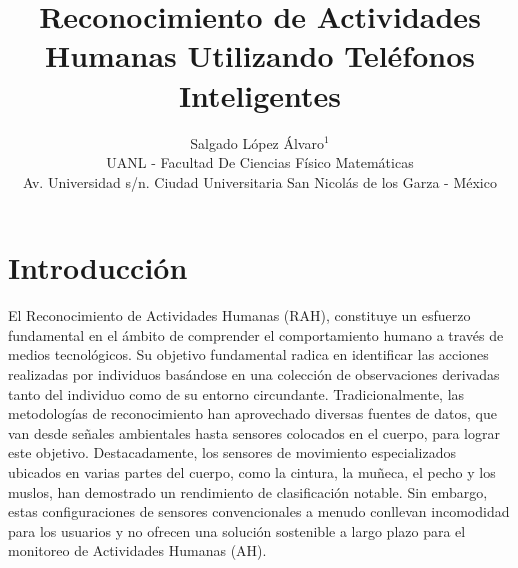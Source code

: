 \documentclass{esannV2}
\begin{document}
\title{Reconocimiento de Actividades Humanas Utilizando Teléfonos Inteligentes}

\author{Salgado López Álvaro$^1$
%
%
\vspace{.3cm}\\
%
UANL - Facultad De Ciencias Físico Matemáticas \\
Av. Universidad s/n. Ciudad Universitaria San Nicolás de los Garza - México
}
%
\maketitle


\section{Introducción}

El Reconocimiento de Actividades Humanas (RAH), constituye un esfuerzo fundamental en el ámbito de comprender el comportamiento humano a través de medios tecnológicos. Su objetivo fundamental radica en identificar las acciones realizadas por individuos basándose en una colección de observaciones derivadas tanto del individuo como de su entorno circundante. Tradicionalmente, las metodologías de reconocimiento han aprovechado diversas fuentes de datos, que van desde señales ambientales hasta sensores colocados en el cuerpo, para lograr este objetivo. Destacadamente, los sensores de movimiento especializados ubicados en varias partes del cuerpo, como la cintura, la muñeca, el pecho y los muslos, han demostrado un rendimiento de clasificación notable. Sin embargo, estas configuraciones de sensores convencionales a menudo conllevan incomodidad para los usuarios y no ofrecen una solución sostenible a largo plazo para el monitoreo de Actividades Humanas (AH).
\end{document}
